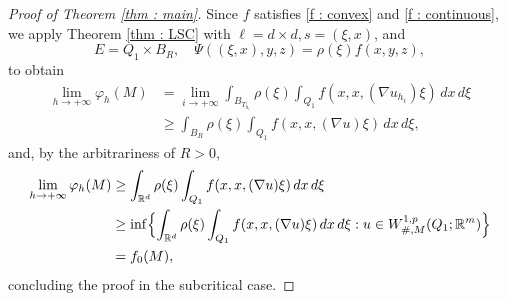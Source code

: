 \documentclass{article}
\theoremstyle{definition}
\newcommand{\f}{\varphi}
\newcommand{\R}{\mathbb{R}}
\begin{document}
\begin{proof}[Proof of Theorem \ref{thm : main}]
Since $f$ satisfies \eqref{f : convex} and \eqref{f : continuous}, we apply Theorem \ref{thm : LSC} with $\ell=d\times d, s=(\xi,x)$, and
\begin{equation*}
    E=Q_1\times B_R, \quad \Psi((\xi,x),y,z)=\rho(\xi)f(x,y,z), 
\end{equation*}
to obtain 
\begin{align*}
     \lim _{h\to+\infty}\f_h(M) & =  \lim _{i\to+\infty} \int_{B_{T_{h_i}}} \rho(\xi)\int_{Q_1} f(x,x,(\nabla u_{h_i} ) \xi)\, dx\,d\xi \\
     & \geq \int_{B_R} \rho(\xi)\int_{Q_1} f(x,x,(\nabla u ) \xi)\, dx\,d\xi, \end{align*}
     and, by the arbitrariness of $R>0$,
\begin{align*}
  \lim _{h\to+\infty}\f_h(M) & \geq \int_{\R^d} \rho(\xi)\int_{Q_1} f(x,x,(\nabla u ) \xi)\, dx\,d\xi \\
  & \geq \inf\Bigl\{ \int_{\R^d} \rho(\xi)\int_{Q_1} f(x,x,(\nabla u ) \xi)\, dx\,d\xi : u\in W^{1,p}_{\#,M}(Q_1; \R^m) \Bigr\} \\
    & = f_0(M),
\end{align*}
concluding the proof in the subcritical case.

\medskip


\end{proof}
\end{document}

